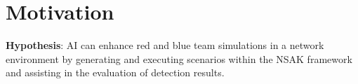 \section{Motivation}

 \textbf{Hypothesis}: AI can enhance red and blue team simulations in a network environment by generating and executing scenarios within the NSAK framework and assisting in the evaluation of detection results.